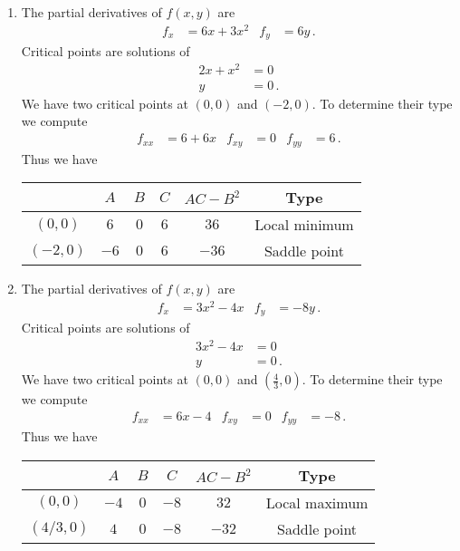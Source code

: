 \begin{solution}
\begin{enumerate}
\item
The partial derivatives of $f(x,y)$ are
\begin{align*}
f_x &= 6x + 3x^2 &
f_y &= 6y\,.
\end{align*}
Critical points are solutions of
\begin{align*}
2x + x^2 &= 0 \\
y &=0\,.
\end{align*}
We have two critical points at $(0,0)$ and $(-2,0)$. To determine their type we compute
\begin{align*}
f_{xx} &= 6+6x &
f_{xy} &= 0 &
f_{yy} &= 6 \,.
\end{align*}
Thus we have
\begin{center}
\begin{tabular}{c|ccc|cc}
 & $A$ & $B$ & $C$ & $AC-B^2$ & Type \\ \hline
$\left(0, 0\right)$ & $6$ & $0$ & $6$ & $36$ & Local minimum \\
$\left(-2, 0 \right)$ & $-6$ & $0$ & $6$ & $-36$ &  Saddle point \\
\end{tabular}
\end{center}

\item
The partial derivatives of $f(x,y)$ are
\begin{align*}
f_x &= 3x^2 - 4x &
f_y &= -8y\,.
\end{align*}
Critical points are solutions of
\begin{align*}
3x^2 -4x &= 0 \\
y &=0\,.
\end{align*}
We have two critical points at $(0,0)$ and $\left(\frac 43,0\right)$. To determine their type we compute
\begin{align*}
f_{xx} &= 6x-4 &
f_{xy} &= 0 &
f_{yy} &= -8 \,.
\end{align*}
Thus we have
\begin{center}
\begin{tabular}{c|ccc|cc}
 & $A$ & $B$ & $C$ & $AC-B^2$ & Type \\ \hline
$\left(0, 0\right)$ & $-4$ & $0$ & $-8$ & $32$ & Local maximum \\
$\left(4/3, 0 \right)$ & $4$ & $0$ & $-8$ & $-32$ &  Saddle point \\
\end{tabular}
\end{center}


\end{enumerate}
\end{solution}
